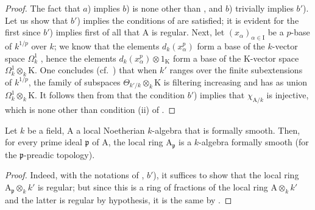 \begin{proof}
The fact that $a$) implies $b$) is none other than , and $b$) trivially implies $b'$).
Let us show that $b'$) implies the conditions of  are satisfied; it is evident for the first  since $b'$) implies first of all that $\mathrm{A}$ is regular.
Next, let $(x_\alpha)_{\alpha\in\mathrm{I}}$ be a $p$-base of $k^{1/p}$ over $k$; we know that the elements $d_k(x_\alpha^p)$ form a base of the $k$-vector space $\Omega^1_k$ , hence the elements $d_k(x_\alpha^p)\otimes 1_\mathrm{K}$ form a base of the $\mathrm{K}$-vector space $\Omega^1_k\otimes_k\mathrm{K}$.
One concludes (cf.~) that when $k'$ ranges over the finite subextensions of $k^{1/p}$, the family of subspaces $\Theta_{k'/k}\otimes_k\mathrm{K}$ is filtering increasing and has as union $\Omega^1_k\otimes_k\mathrm{K}$.
It follows then from  that the condition $b'$) implies that $\chi_{\mathrm{A}/k}$ is injective, which is none other than condition (ii) of .
\end{proof}

\begin{corollary}[22.5.9]
\label{0.22.5.9}
Let $k$ be a field, $\mathrm{A}$ a local Noetherian $k$-algebra that is formally smooth.
Then, for every prime ideal $\mathfrak{p}$ of $\mathrm{A}$, the local ring $\mathrm{A}_\mathfrak{p}$ is a $k$-algebra formally smooth (for the $\mathfrak{p}$-preadic topology).
\end{corollary}

\begin{proof}
Indeed, with the notations of , $b'$), it suffices to show that the local ring $\mathrm{A}_\mathfrak{p}\otimes_kk'$ is regular; but since this is a ring of fractions of the local ring $\mathrm{A}\otimes_kk'$ and the latter is regular by hypothesis, it is the same by .
\end{proof}

